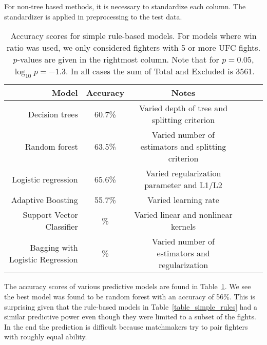 For non-tree based methods, it is necessary to standardize
each column. The standardizer is applied in preprocessing to
the test data.

\begin{center}
\begin{table}[h]
\begin{tabular}{r|ccccc}
  \toprule
  Model & Accuracy & Notes\\
  \hline
  Decision trees & 60.7\% & Varied depth of tree and splitting criterion\\
  Random forest & 63.5\% & Varied number of estimators and splitting criterion\\
  Logistic regression & 65.6\% & Varied regularization parameter and L1/L2\\
  Adaptive Boosting & 55.7\% & Varied learning rate\\
  Support Vector Classifier & \% & Varied linear and nonlinear kernels\\
  Bagging with Logistic Regression & \% & Varied number of estimators and regularization\\
  \bottomrule
\end{tabular}
\caption{Accuracy scores for simple rule-based models. For models where win ratio was used, we only considered
fighters with 5 or more UFC fights. $p$-values are given in the rightmost column. Note that for $p=0.05$, $\log_{10}p = -1.3$. In all
cases the sum of
Total and Excluded is 3561.}
\label{table_ML_models}
\end{table}
\end{center}

The accuracy scores of various predictive models are found in Table~\ref{table_ML_models}.
We see the best model was found to be random forest with an accuracy of 56\%. This is
surprising given that the rule-based models in Table~\ref{table_simple_rules} had a
similar predictive power even though they were limited to a subset of the fights.
In the end the prediction is difficult because matchmakers try to pair fighters with
roughly equal ability.

